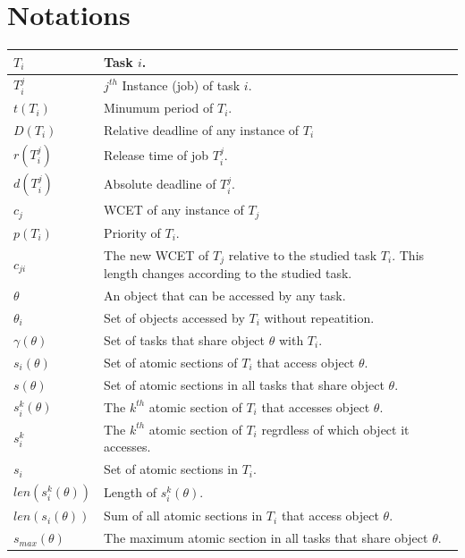 \documentclass[a4paper,english]{article}
\providecommand{\tabularnewline}{\\}
\begin{document}
\pagebreak 
\appendix
\section{\label{notations}Notations}


\begin{adjustwidth}{-1.5cm}{}
\begin{flushleft}
\begin{tabular}{|>{\raggedright}p{2.5cm}|>{\raggedright}p{12cm}|}
\hline 
$T_{i}$ & \raggedright{}Task $i$.\tabularnewline
\hline 
$T_{i}^{j}$ & $j^{th}$ Instance (job) of task $i$.\tabularnewline
\hline 
$t(T_{i})$ & Minumum period of $T_{i}$.\tabularnewline
\hline 
$D(T_{i})$ & Relative deadline of any instance of $T_{i}$\tabularnewline
\hline 
$r(T_{i}^{j})$ & Release time of job $T_{i}^{j}$.\tabularnewline
\hline 
$d(T_{i}^{j})$ & Absolute deadline of $T_{i}^{j}$.\tabularnewline
\hline 
$c_{j}$ & WCET of any instance of $T_{j}$\tabularnewline
\hline 
$p(T_{i})$ & \raggedright{}Priority of $T_{i}$.\tabularnewline
\hline 
$c_{ji}$ & The new WCET of $T_{j}$ relative to the studied task $T_{i}$. This
length changes according to the studied task.\tabularnewline
\hline 
$\theta$ & An object that can be accessed by any task.\tabularnewline
\hline 
$\theta_{i}$ & Set of objects accessed by $T_{i}$ without repeatition.\tabularnewline
\hline 
$\gamma(\theta)$ & Set of tasks that share object $\theta$ with $T_{i}$.\tabularnewline
\hline 
$s_{i}(\theta)$ & Set of atomic sections of $T_{i}$ that access object $\theta$.\tabularnewline
\hline 
$s(\theta)$ & Set of atomic sections in all tasks that share object $\theta$.\tabularnewline
\hline 
$s_{i}^{k}(\theta)$ & The $k^{th}$ atomic section of $T_{i}$ that accesses object $\theta$.\tabularnewline
\hline 
$s_{i}^{k}$ & The $k^{th}$ atomic section of $T_{i}$ regrdless of which object
it accesses.\tabularnewline
\hline 
$s_{i}$ & Set of atomic sections in $T_{i}$.\tabularnewline
\hline 
$len(s_{i}^{k}(\theta))$ & Length of $s_{i}^{k}(\theta)$.\tabularnewline
\hline 
$len(s_{i}(\theta))$ & Sum of all atomic sections in $T_{i}$ that access object $\theta$.\tabularnewline
\hline 
$s_{max}(\theta)$ & The maximum atomic section in all tasks that share object $\theta$.\tabularnewline

\end{tabular}
\end{flushleft}
\end{adjustwidth}
\end{document}
